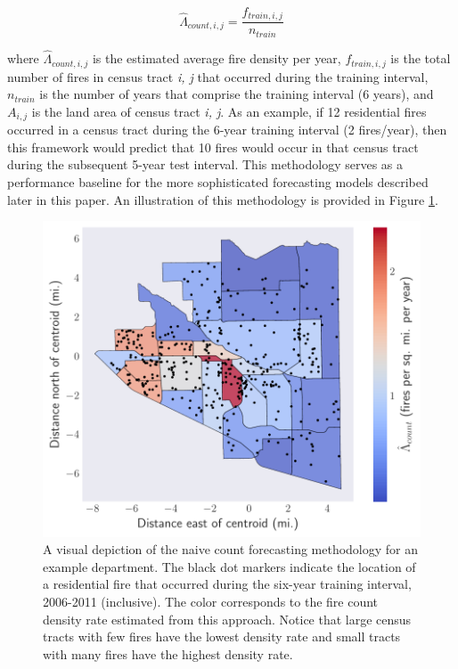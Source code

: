 \documentclass{svjour3}
\begin{document}
\begin{equation}
  \label{eqn:naive_count}
  \hat{\Lambda}_{count,i,j} = \frac{f_{train,i,j}}{n_{train}} 
\end{equation}

\noindent where $\hat{\Lambda}_{count,i,j}$ is the estimated average fire density per year, $f_{train,i,j}$ is the total number of fires in census tract \textit{i, j} that occurred during the training interval, $n_{train}$ is the number of years that comprise the training interval (6 years), and $A_{i,j}$ is the land area of census tract \textit{i, j}. As an example, if 12 residential fires occurred in a census tract during the 6-year training interval (2 fires/year), then this framework would predict that 10 fires would occur in that census tract during the subsequent 5-year test interval. This methodology serves as a performance baseline for the more sophisticated forecasting models described later in this paper. An illustration of this methodology is provided in Figure \ref{fig:spatial_histogram}. 


\begin{figure}[htb] \centering
\includegraphics[width=.75\textwidth]{./figures/spatial_histogram.pdf}
\caption{A visual depiction of the naive count forecasting methodology for an example department. The black dot markers indicate the location of a residential fire that occurred during the six-year training interval, 2006-2011 (inclusive). The color corresponds to the fire count density rate estimated from this approach. Notice that large census tracts with few fires have the lowest density rate and small tracts with many fires have the highest density rate.}
\label{fig:spatial_histogram}
\end{figure}
\end{document}
